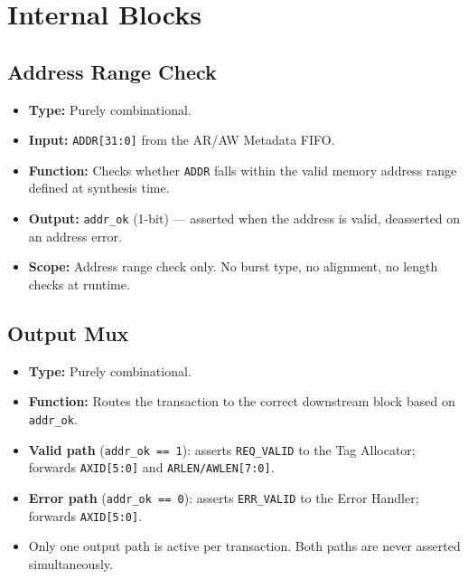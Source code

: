 \documentclass[11pt,a4paper]{article}
\begin{document}
\section{Internal Blocks}

\subsection{Address Range Check}

\begin{itemize}
  \item \textbf{Type:} Purely combinational.
  \item \textbf{Input:} \texttt{ADDR[31:0]} from the AR/AW Metadata
        FIFO.
  \item \textbf{Function:} Checks whether \texttt{ADDR} falls within
        the valid memory address range defined at synthesis time.
  \item \textbf{Output:} \texttt{addr\_ok} (1-bit) — asserted when the
        address is valid, deasserted on an address error.
  \item \textbf{Scope:} Address range check only. No burst type, no
        alignment, no length checks at runtime.
\end{itemize}

\subsection{Output Mux}

\begin{itemize}
  \item \textbf{Type:} Purely combinational.
  \item \textbf{Function:} Routes the transaction to the correct
        downstream block based on \texttt{addr\_ok}.
  \item \textbf{Valid path} (\texttt{addr\_ok == 1}): asserts
        \texttt{REQ\_VALID} to the Tag Allocator; forwards
        \texttt{AXID[5:0]} and \texttt{ARLEN/AWLEN[7:0]}.
  \item \textbf{Error path} (\texttt{addr\_ok == 0}): asserts
        \texttt{ERR\_VALID} to the Error Handler; forwards
        \texttt{AXID[5:0]}.
  \item Only one output path is active per transaction. Both paths are
        never asserted simultaneously.
\end{itemize}

\end{document}
